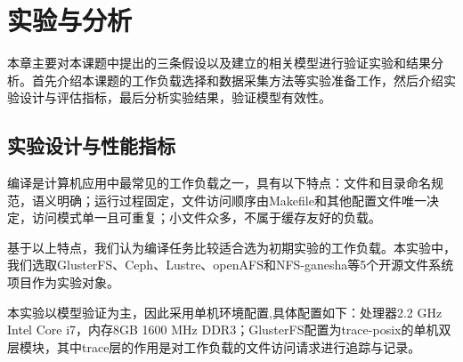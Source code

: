 \chapter{实验与分析}

%
%
%
%
本章主要对本课题中提出的三条假设以及建立的相关模型进行验证实验和结果分析。首先介绍本课题的工作负载选择和数据采集方法等实验准备工作，然后介绍实验设计与评估指标，最后分析实验结果，验证模型有效性。

\section{实验设计与性能指标}
编译是计算机应用中最常见的工作负载之一，具有以下特点：文件和目录命名规范，语义明确；运行过程固定，文件访问顺序由Makefile和其他配置文件唯一决定，访问模式单一且可重复；小文件众多，不属于缓存友好的负载。

基于以上特点，我们认为编译任务比较适合选为初期实验的工作负载。本实验中，我们选取GlusterFS、Ceph、Lustre、openAFS和NFS-ganesha等5个开源文件系统项目作为实验对象。

本实验以模型验证为主，因此采用单机环境配置,具体配置如下：处理器2.2 GHz Intel Core i7，内存8GB 1600 MHz DDR3；GlusterFS配置为trace-posix的单机双层模块，其中trace层的作用是对工作负载的文件访问请求进行追踪与记录。


